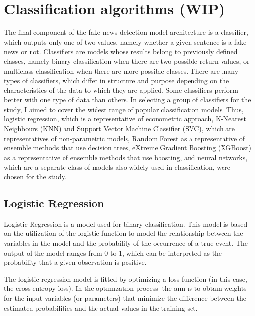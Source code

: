 \section{Classification algorithms (WIP)}
The final component of the fake news detection model architecture is a classifier, which outputs only one of two values, namely whether a given sentence is a fake news or not. Classifiers are models whose results belong to previously defined classes, namely binary classification when there are two possible return values, or multiclass classification when there are more possible classes. There are many types of classifiers, which differ in structure and purpose depending on the characteristics of the data to which they are applied. Some classifiers perform better with one type of data than others. In selecting a group of classifiers for the study, I aimed to cover the widest range of popular classification models. Thus, logistic regression, which is a representative of econometric approach, K-Nearest Neighbours (KNN) and Support Vector Machine Classifier (SVC), which are representatives of non-parametric models, Random Forest as a representative of ensemble methods that use decision trees, eXtreme Gradient Boosting (XGBoost) as a representative of ensemble methods that use boosting, and neural networks, which are a separate class of models also widely used in classification, were chosen for the study.

\subsection{Logistic Regression}
Logistic Regression is a model used for binary classification. This model is based on the utilization of the logistic function to model the relationship between the variables in the model and the probability of the occurrence of a true event. The output of the model ranges from 0 to 1, which can be interpreted as the probability that a given observation is positive.

The logistic regression model is fitted by optimizing a loss function (in this case, the cross-entropy loss). In the optimization process, the aim is to obtain weights for the input variables (or parameters) that minimize the difference between the estimated probabilities and the actual values in the training set.

